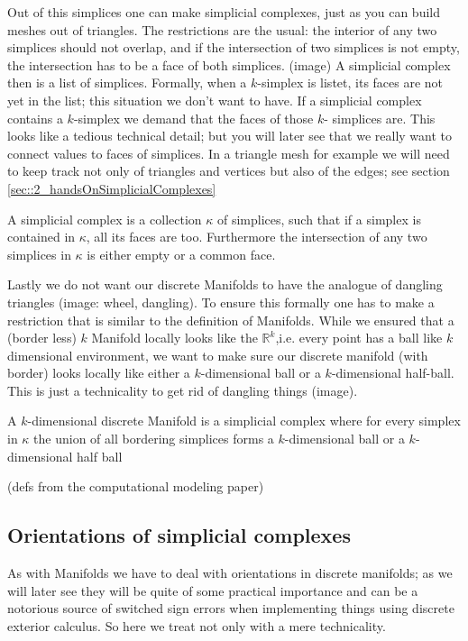 Out of this simplices one can make simplicial complexes, just as you can build meshes out of triangles. The restrictions are the usual: the interior of any two simplices should not overlap, and if the intersection of two simplices is not empty, the intersection has to be a face of both simplices. (image) A simplicial complex then is a list of simplices. Formally, when a $k$-simplex is listet, its faces are not yet in the list; this situation we don't want to have. If a simplicial complex contains a  $k$-simplex we demand that the faces of those $k$- simplices are. This looks like a tedious technical detail; but you will later see that we really want to connect values to faces of simplices. In a triangle mesh for example we will need to keep track not only of triangles and vertices but also of the edges; see section \ref{sec::2_handsOnSimplicialComplexes}

\begin{definition}
A simplicial  complex is a collection $\kappa$ of simplices, such that if a simplex is contained in $\kappa$, all its faces are too. Furthermore the intersection of any two simplices in  $\kappa$ is either empty or a common face.
\end{definition}

Lastly we do not want our discrete Manifolds  to have the analogue of dangling triangles (image: wheel, dangling). To ensure this formally one has to make a restriction that is similar to the definition of Manifolds. While we ensured that a (border less) $k$ Manifold locally looks like the $\mathbb R^k$,i.e. every point has a ball like $k$ dimensional environment, we want to make sure our discrete manifold (with border) looks locally like either a $k$-dimensional ball or a $k$-dimensional half-ball. This is just a technicality to get rid of dangling things (image).

\begin{definition}
A $k$-dimensional discrete Manifold is a simplicial complex where for every simplex in $\kappa$ the union of all bordering simplices forms a $k$-dimensional ball or a $k$-dimensional half ball
\end{definition} 
(defs from the computational modeling paper)


\subsection{Orientations of simplicial complexes}
As with Manifolds we have to deal with orientations in discrete manifolds; as we will later see they will be quite of some practical importance and can be a notorious source of switched sign errors when implementing things using discrete exterior calculus. So here we treat not only with a mere technicality.


